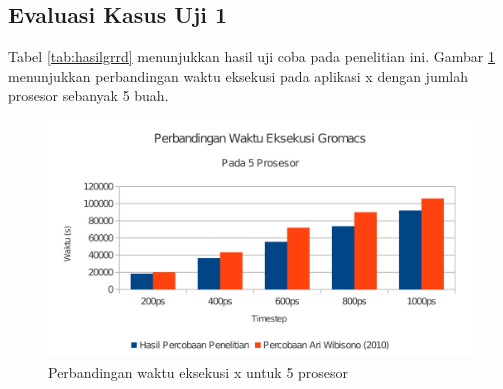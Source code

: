 \subsection{Evaluasi Kasus Uji 1}
Tabel \ref{tab:hasilgrrd} menunjukkan hasil uji coba pada penelitian ini.  Gambar \ref{fig:grafgro5} menunjukkan perbandingan waktu eksekusi pada aplikasi x dengan jumlah prosesor sebanyak 5 buah.

\begin{figure}
	\centering
	\includegraphics[width=1\textwidth]
		{pics/5np-gromacs-chart.pdf}
	\caption{Perbandingan waktu eksekusi x untuk 5 prosesor}
	\label{fig:grafgro5}
\end{figure}
\paragraph{}